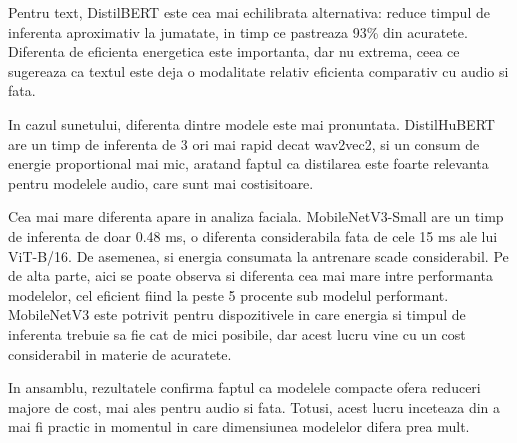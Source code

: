 \documentclass[12pt, a4paper]{article}
\begin{document}
Pentru text, DistilBERT este cea mai echilibrata alternativa: reduce timpul de inferenta aproximativ la jumatate, in timp ce pastreaza 93\% din acuratete. Diferenta de eficienta energetica este importanta, dar nu extrema, ceea ce sugereaza ca textul este deja o modalitate relativ eficienta comparativ cu audio si fata.

In cazul sunetului, diferenta dintre modele este mai pronuntata. DistilHuBERT are un timp de inferenta de 3 ori mai rapid decat wav2vec2, si un consum de energie proportional mai mic, aratand faptul ca distilarea este foarte relevanta pentru modelele audio, care sunt mai costisitoare.

Cea mai mare diferenta apare in analiza faciala. MobileNetV3-Small are un timp de inferenta de doar 0.48 ms, o diferenta considerabila fata de cele 15 ms ale lui ViT-B/16. De asemenea, si energia consumata la antrenare scade considerabil. Pe de alta parte, aici se poate observa si diferenta cea mai mare intre performanta modelelor, cel eficient fiind la peste 5 procente sub modelul performant. MobileNetV3 este potrivit pentru dispozitivele in care energia si timpul de inferenta trebuie sa fie cat de mici posibile, dar acest lucru vine cu un cost considerabil in materie de acuratete.

In ansamblu, rezultatele confirma faptul ca modelele compacte ofera reduceri majore de cost, mai ales pentru audio si fata. Totusi, acest lucru inceteaza din a mai fi practic in momentul in care dimensiunea modelelor difera prea mult.
\begin{table}[ht]
\centering

\label{tab:efficiency}
\caption{Eficiența modelelor unimodale: viteza de inferență, energia consumată la antrenare și scorul macro-F1 pe MELD.}
\end{table}
\newpage
\end{document}
